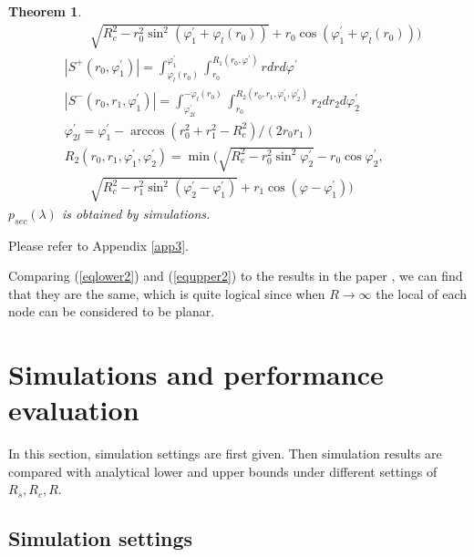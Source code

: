 \documentclass[journal, twoside]{IEEEtran}
\newtheorem{theorem}{Theorem}
\begin{document}
\begin{theorem}
\begin{align}
		& \qquad   \sqrt{R_c^2 - r_0^2\sin^2 (\varphi_1^\prime +\varphi_l(r_0))} + r_0 \cos (\varphi_1^\prime+\varphi_l(r_0))) \nonumber \\
		&|S^+(r_0, \varphi_1^\prime)| = \int_{\varphi_l(r_0)}^{\varphi_1^\prime} \int_{r_0}^{R_1(r_0, \varphi^\prime)} r dr d\varphi^\prime \label{eqsplusR}\\
		&|S^-(r_0, r_1, \varphi_1^\prime)| = \int_{\varphi_{2l}^\prime}^{-\varphi_l(r_0)} \int_{r_0}^{R_2(r_0, r_1, \varphi_1^\prime, \varphi_2^\prime)} r_2 dr_2 d\varphi_2^\prime \label{eqsminusR} \\
		&\varphi_{2l}^\prime = \varphi_1^\prime - \arccos(r_0^2+r_1^2-R_c^2)/(2r_0r_1) \nonumber\\
		&R_2(r_0, r_1, \varphi_1^\prime, \varphi_2^\prime) = \min(\sqrt{R_c^2 - r_0^2\sin^2 \varphi_2^\prime} - r_0 \cos \varphi_2^\prime, \nonumber  \\
		& \qquad \sqrt{R_c^2 - r_1^2\sin^2 (\varphi_2^\prime-\varphi_1^\prime)} + r_1 \cos (\varphi-\varphi_1^\prime))  \nonumber
	\end{align}
	$p_{sec}(\lambda)$ is obtained by simulations.
\end{theorem}

\begin{IEEEproof}
Please refer to Appendix \ref{app3}.
\end{IEEEproof}

Comparing (\ref{eqlower2}) and (\ref{equpper2}) to the results in the paper \cite{YMD12},
we can find that they are the same, which is quite logical since when $R \to \infty$ the local
of each node can be considered to be planar. 


















\section{Simulations and performance evaluation}

In this section, simulation settings are first given. Then simulation 
results are compared with analytical lower and upper bounds under 
different settings of $R_s, R_c, R$.

\subsection{Simulation settings}
\end{document}
